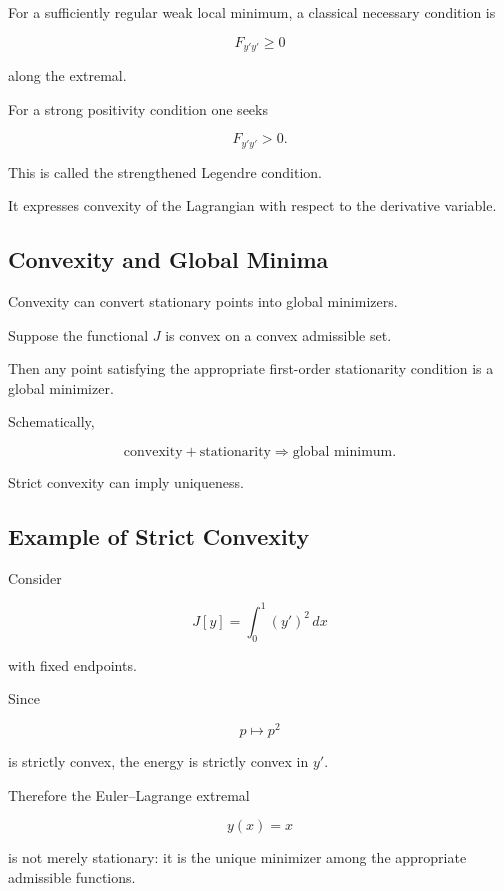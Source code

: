 For a sufficiently regular weak local minimum, a classical necessary
condition is

\[
\boxed{
F_{y'y'}\geq0
}
\]

along the extremal.

For a strong positivity condition one seeks

\[
\boxed{
F_{y'y'}>0.
}
\]

This is called the strengthened Legendre condition.

It expresses convexity of the Lagrangian with respect to the derivative
variable.

\subsection{Convexity and Global Minima}
\label{subsec:variational-convexity}

Convexity can convert stationary points into global minimizers.

Suppose the functional \(J\) is convex on a convex admissible set.

Then any point satisfying the appropriate first-order stationarity
condition is a global minimizer.

Schematically,

\[
\boxed{
\text{convexity}
+
\text{stationarity}
\Longrightarrow
\text{global minimum}.
}
\]

Strict convexity can imply uniqueness.

\subsection{Example of Strict Convexity}
\label{subsec:strict-convexity-example}

Consider

\[
J[y]
=
\int_0^1
(y')^2\,dx
\]

with fixed endpoints.

Since

\[
p\mapsto p^2
\]

is strictly convex, the energy is strictly convex in \(y'\).

Therefore the Euler--Lagrange extremal

\[
y(x)=x
\]

is not merely stationary: it is the unique minimizer among the
appropriate admissible functions.

